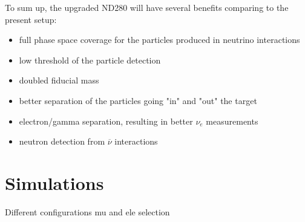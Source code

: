 \documentclass[../main.tex]{subfiles}
\begin{document}
To sum up, the upgraded ND280 will have several benefits comparing to the present setup:
\begin{itemize}
  \item full phase space coverage for the particles produced in neutrino interactions
  \item low threshold of the particle detection
  \item doubled fiducial mass
  \item better separation of the particles going "in" and "out" the target
  \item electron/gamma separation, resulting in better $\nu_e$ measurements
  \item neutron detection from $\overline{\nu}$ interactions
\end{itemize}

\section{Simulations}
\label{ch:up:sim}

Different configurations mu and ele selection
\end{document}
